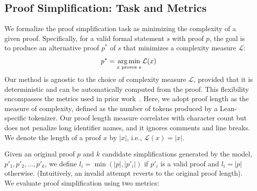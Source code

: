\subsection{Proof Simplification: Task and Metrics} \label{sec:task-metrics}

We formalize the proof simplification task as minimizing the complexity of a given proof. Specifically, for a valid formal statement $s$ with proof $p$, the goal is to produce an alternative proof $p^*$ of $s$ that minimizes a complexity measure $\mathcal{L}$:
\vspace{-6pt}
\begin{equation*}
p^* = \operatorname*{arg\,min}_{x \text{ proves } s} \mathcal{L}(x)
\end{equation*}
%
Our method is agnostic to the choice of complexity measure $\mathcal{L}$, provided that it is deterministic and can be automatically computed from the proof. This flexibility encompasses the metrics used in prior work~\citep{ahuja2024improver}. Here, we adopt proof length as the measure of complexity, defined as the number of tokens produced by a Lean-specific tokenizer. Our proof length measure correlates with character count but does not penalize long identifier names, and it ignores comments and line breaks. We denote the length of a proof $x$ by $|x|$, i.e., $\mathcal{L}(x) = |x|$.



Given an original proof $p$ and $k$ candidate simplifications generated by the model, $p'_1, p'_2, \ldots, p'_k$, we define $l_i = \min(|p|, |p'_i|)$ if $p'_i$ is a valid proof and $l_i = |p|$ otherwise. (Intuitively, an invalid attempt reverts to the original proof length). We evaluate proof simplification using two metrics:

